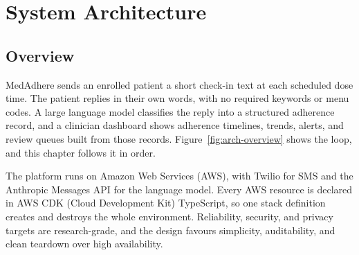 \chapter{System Architecture}
\label{ch:architecture}

\section{Overview}
\label{sec:arch-overview}

MedAdhere sends an enrolled patient a short check-in text at each scheduled
dose time. The patient replies in their own words, with no required keywords or
menu codes. A large language model classifies the reply into a structured
adherence record, and a clinician dashboard shows adherence timelines, trends,
alerts, and review queues built from those records.
Figure~\ref{fig:arch-overview} shows the loop, and this chapter follows it in
order.

The platform runs on Amazon Web Services (AWS), with Twilio for SMS and the
Anthropic Messages API for the language model. Every AWS resource is declared
in AWS CDK (Cloud Development Kit) TypeScript, so one stack definition creates
and destroys the whole environment. Reliability, security, and privacy targets
are research-grade, and the design favours simplicity, auditability, and clean
teardown over high availability.

